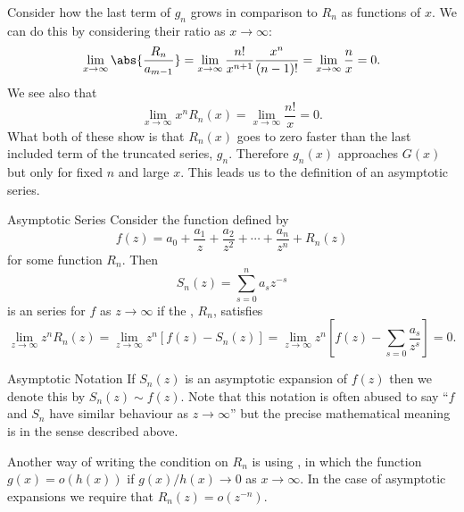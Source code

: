 \documentclass[fleqn]{NotesClass}
\begin{document}
    Consider how the last term of \(g_n\) grows in comparison to \(R_n\) as functions of \(x\).
    We can do this by considering their ratio as \(x \to \infty\):
    \begin{equation}
        \lim_{x\to\infty} \abs{\frac{R_n}{a_{m-1}}} = \lim_{x\to\infty} \frac{n!}{x^{n+1}}\frac{x^n}{(n-1)!} = \lim_{x\to\infty} \frac{n}{x} = 0.
    \end{equation}
    We see also that
    \begin{equation}
        \lim_{x\to\infty} x^nR_n(x) = \lim_{x\to\infty} \frac{n!}{x} = 0.
    \end{equation}
    What both of these show is that \(R_n(x)\) goes to zero faster than the last included term of the truncated series, \(g_n\).
    Therefore \(g_n(x)\) approaches \(G(x)\) but only for fixed \(n\) and large \(x\).
    This leads us to the definition of an asymptotic series.
    
    \begin{dfn}{Asymptotic Series}{}
        Consider the function defined by
        \begin{equation}
            f(z) = a_0 + \frac{a_1}{z} + \frac{a_2}{z^2} + \dotsb + \frac{a_n}{z^n} + R_n(z)
        \end{equation}
        for some function \(R_n\).
        Then
        \begin{equation}
            S_n(z) = \sum_{s=0}^{n}a_sz^{-s}
        \end{equation}
        is an  series for \(f\) as \(z \to \infty\) if the , \(R_n\), satisfies
        \begin{equation}
            \lim_{z\to\infty} z^nR_n(z) = \lim_{z\to\infty} z^n
            [f(z) -  S_n(z)] = \lim_{z\to\infty} z^n\left[ f(z) - \sum_{s=0} \frac{a_s}{z^s} \right] = 0.
        \end{equation}
    \end{dfn}
    
    \begin{ntn}{Asymptotic Notation}{}
        If \(S_n(z)\) is an asymptotic expansion of \(f(z)\) then we denote this by \(S_n(z) \sim f(z)\).
        Note that this notation is often abused to say \enquote{\(f\) and \(S_n\) have similar behaviour as \(z \to \infty\)} but the precise mathematical meaning is in the sense described above.
        
        Another way of writing the condition on \(R_n\) is using , in which the function \(g(x) = o(h(x))\) if \(g(x)/h(x) \to 0\) as \(x \to \infty\).
        In the case of asymptotic expansions we require that \(R_n(z) = o(z^{-n})\).
    \end{ntn}
\end{document}
